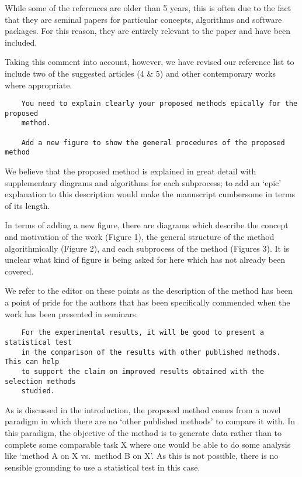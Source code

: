 \documentclass[11pt]{article}
\begin{document}
While some of the references are older than 5 years, this is often due to the
fact that they are seminal papers for particular concepts, algorithms and
software packages. For this reason, they are entirely relevant to the paper and
have been included.

Taking this comment into account, however, we have revised our reference list to
include two of the suggested articles (4 \& 5) and other contemporary works
where appropriate.\\

\begin{tcolorbox}
\begin{verbatim}
    You need to explain clearly your proposed methods epically for the proposed
    method.

    Add a new figure to show the general procedures of the proposed method
\end{verbatim}
\end{tcolorbox}

We believe that the proposed method is explained in great detail with
supplementary diagrams and algorithms for each subprocess; to add an `epic'
explanation to this description would make the manuscript cumbersome in terms of
its length.

In terms of adding a new figure, there are diagrams which describe the concept
and motivation of the work (Figure 1), the general structure of the method
algorithmically (Figure 2), and each subprocess of the method (Figures 3).
It is unclear what kind of figure is being asked for here which has not already
been covered.

We refer to the editor on these points as the description of the method has been
a point of pride for the authors that has been specifically commended when the
work has been presented in seminars.\\

\begin{tcolorbox}
\begin{verbatim}
    For the experimental results, it will be good to present a statistical test
    in the comparison of the results with other published methods. This can help
    to support the claim on improved results obtained with the selection methods
    studied.
\end{verbatim}
\end{tcolorbox}

As is discussed in the introduction, the proposed method comes from a novel
paradigm in which there are no `other published methods' to compare it with. In
this paradigm, the objective of the method is to generate data rather than to
complete some comparable task X where one would be able to do some analysis like
`method A on X vs.\ method B on X'. As this is not possible, there is no
sensible grounding to use a statistical test in this case.\\
\end{document}
